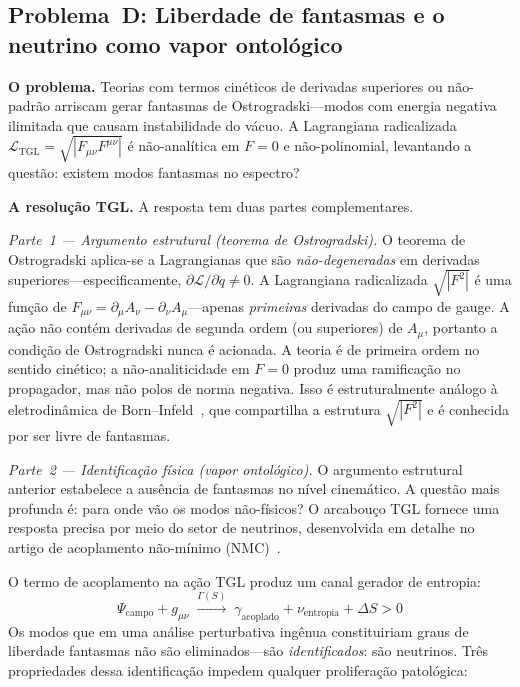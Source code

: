 \documentclass[12pt,a4paper,twocolumn]{article}
\begin{document}
\subsection{Problema~D: Liberdade de fantasmas e o neutrino como vapor ontológico}
\label{sec:problem_d}

\textbf{O problema.} Teorias com termos cinéticos de derivadas superiores ou
não-padrão arriscam gerar fantasmas de Ostrogradski---modos com energia
negativa ilimitada que causam instabilidade do vácuo. A Lagrangiana
radicalizada $\mathcal{L}_{\text{TGL}} = \sqrt{|F_{\mu\nu}F^{\mu\nu}|}$ é
não-analítica em $F=0$ e não-polinomial, levantando a questão: existem modos
fantasmas no espectro?

\textbf{A resolução TGL.} A resposta tem duas partes complementares.

\textit{Parte~1 --- Argumento estrutural (teorema de Ostrogradski).} O
teorema de Ostrogradski aplica-se a Lagrangianas que são \emph{não-degeneradas}
em derivadas superiores---especificamente, $\partial \mathcal{L}/\partial\ddot{q}
\neq 0$. A Lagrangiana radicalizada $\sqrt{|F^2|}$ é uma função de
$F_{\mu\nu} = \partial_\mu A_\nu - \partial_\nu A_\mu$---apenas \emph{primeiras}
derivadas do campo de gauge. A ação não contém derivadas de segunda ordem
(ou superiores) de $A_\mu$, portanto a condição de Ostrogradski nunca é
acionada. A teoria é de primeira ordem no sentido cinético; a
não-analiticidade em $F=0$ produz uma ramificação no propagador, mas não
polos de norma negativa. Isso é estruturalmente análogo à eletrodinâmica de
Born--Infeld~\cite{BornInfeld1934}, que compartilha a estrutura $\sqrt{|F^2|}$
e é conhecida por ser livre de fantasmas.

\textit{Parte~2 --- Identificação física (vapor ontológico).} O argumento
estrutural anterior estabelece a ausência de fantasmas no nível cinemático. A
questão mais profunda é: para onde vão os modos não-físicos? O arcabouço
TGL fornece uma resposta precisa por meio do setor de neutrinos, desenvolvida
em detalhe no artigo de acoplamento não-mínimo (NMC)~\cite{Miguel2025NMC}.

O termo de acoplamento na ação TGL produz um canal gerador de entropia:
\begin{equation}
\Psi_{\text{campo}} + g_{\mu\nu} \;\xrightarrow{\Gamma(S)}\;
\gamma_{\text{acoplado}} + \nu_{\text{entropia}} + \Delta S > 0
\label{eq:vapor}
\end{equation}
Os modos que em uma análise perturbativa ingênua constituiriam graus de
liberdade fantasmas não são eliminados---são \emph{identificados}: são
neutrinos. Três propriedades dessa identificação impedem qualquer
proliferação patológica:
\end{document}
